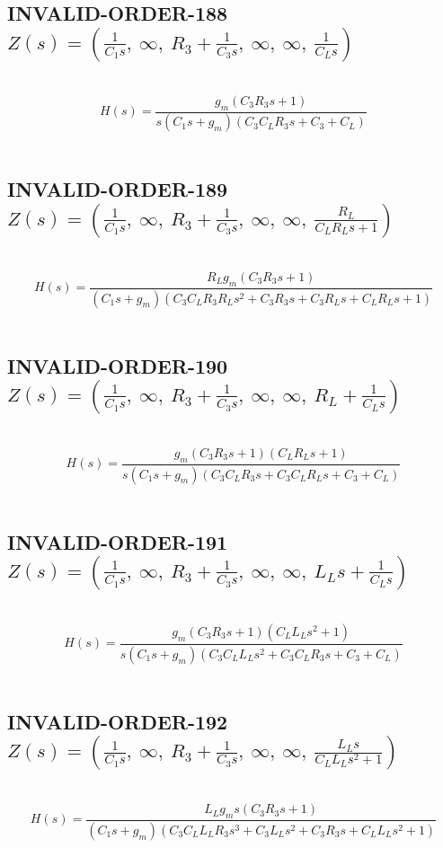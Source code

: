 \documentclass{article}
\begin{document}
\subsection{INVALID-ORDER-188 $Z(s) = \left( \frac{1}{C_{1} s}, \  \infty, \  R_{3} + \frac{1}{C_{3} s}, \  \infty, \  \infty, \  \frac{1}{C_{L} s}\right)$ } \ 
\textbf{\[H(s) = \frac{g_{m} \left(C_{3} R_{3} s + 1\right)}{s \left(C_{1} s + g_{m}\right) \left(C_{3} C_{L} R_{3} s + C_{3} + C_{L}\right)}\] } \ 
\subsection{INVALID-ORDER-189 $Z(s) = \left( \frac{1}{C_{1} s}, \  \infty, \  R_{3} + \frac{1}{C_{3} s}, \  \infty, \  \infty, \  \frac{R_{L}}{C_{L} R_{L} s + 1}\right)$ } \ 
\textbf{\[H(s) = \frac{R_{L} g_{m} \left(C_{3} R_{3} s + 1\right)}{\left(C_{1} s + g_{m}\right) \left(C_{3} C_{L} R_{3} R_{L} s^{2} + C_{3} R_{3} s + C_{3} R_{L} s + C_{L} R_{L} s + 1\right)}\] } \ 
\subsection{INVALID-ORDER-190 $Z(s) = \left( \frac{1}{C_{1} s}, \  \infty, \  R_{3} + \frac{1}{C_{3} s}, \  \infty, \  \infty, \  R_{L} + \frac{1}{C_{L} s}\right)$ } \ 
\textbf{\[H(s) = \frac{g_{m} \left(C_{3} R_{3} s + 1\right) \left(C_{L} R_{L} s + 1\right)}{s \left(C_{1} s + g_{m}\right) \left(C_{3} C_{L} R_{3} s + C_{3} C_{L} R_{L} s + C_{3} + C_{L}\right)}\] } \ 
\subsection{INVALID-ORDER-191 $Z(s) = \left( \frac{1}{C_{1} s}, \  \infty, \  R_{3} + \frac{1}{C_{3} s}, \  \infty, \  \infty, \  L_{L} s + \frac{1}{C_{L} s}\right)$ } \ 
\textbf{\[H(s) = \frac{g_{m} \left(C_{3} R_{3} s + 1\right) \left(C_{L} L_{L} s^{2} + 1\right)}{s \left(C_{1} s + g_{m}\right) \left(C_{3} C_{L} L_{L} s^{2} + C_{3} C_{L} R_{3} s + C_{3} + C_{L}\right)}\] } \ 
\subsection{INVALID-ORDER-192 $Z(s) = \left( \frac{1}{C_{1} s}, \  \infty, \  R_{3} + \frac{1}{C_{3} s}, \  \infty, \  \infty, \  \frac{L_{L} s}{C_{L} L_{L} s^{2} + 1}\right)$ } \ 
\textbf{\[H(s) = \frac{L_{L} g_{m} s \left(C_{3} R_{3} s + 1\right)}{\left(C_{1} s + g_{m}\right) \left(C_{3} C_{L} L_{L} R_{3} s^{3} + C_{3} L_{L} s^{2} + C_{3} R_{3} s + C_{L} L_{L} s^{2} + 1\right)}\] } \ 
\end{document}
